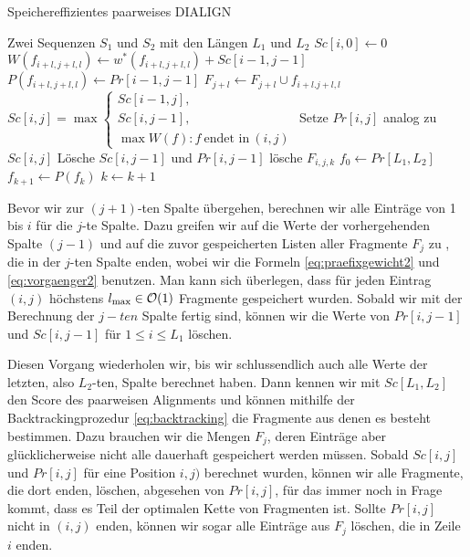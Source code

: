 \begin{algorithm}[H]
	\caption{Speichereffizientes paarweises DIALIGN}
	\label{alg:speichereffizient}
	\begin{algorithmic}[1]
		
		\Require Zwei Sequenzen $S_1$ und $S_2$ mit den Längen $L_1$ und $L_2$
		\State $Sc[i,0] \gets 0$
		\EndFor
		\label{algl:fragmentgewichte}
		\State $W(f_{i+l,j+l,l}) \gets w^*(f_{i+l,j+l,l}) + Sc[i\!-\!1,j\!-\!1]$
		\State $P(f_{i+l,j+l,l}) \gets Pr[i\!-\!1,j\!-\!1]$
		\State $F_{j+l} \gets F_{j+l} \cup {f_{i+l.j+l,l}}$\label{algl:fragmentliste}
		\EndFor
		\State
		$Sc[i,j] = \max
		\begin{cases}
		Sc[i\!-\!1,j], \\
		Sc[i,j\!-\!1], \\
		\max{W(f): f\: \text{endet in}\: (i,j)}
		\end{cases}$\label{algl:praefix}
		\State Setze $Pr[i,j]$ analog zu $Sc[i,j]$
		\State Lösche $Sc[i,j\!-\!1]$ und $Pr[i,j\!-\!1]$
		\State lösche $F_{i,j,k}$
		\EndFor
		\EndFor
		\EndFor
		\State $f_0 \gets Pr[L_1,L_2]$
		\State $f_{k+1} \gets P(f_{k})$
		\State $k \gets k+1$
		\EndWhile 
		\EndProcedure
	\end{algorithmic}
\end{algorithm}

Bevor wir zur $(j+1)$-ten Spalte übergehen, berechnen wir alle Einträge von 1 bis $i$ für die $j$-te Spalte. Dazu greifen wir auf die Werte der vorhergehenden Spalte $(j-1)$ und auf die zuvor gespeicherten Listen aller Fragmente $F_j$ zu , die in der $j$-ten Spalte enden, wobei wir die Formeln \ref{eq:praefixgewicht2} und \ref{eq:vorgaenger2} benutzen. Man kann sich überlegen, dass für jeden Eintrag $(i,j)$ höchstens $l_{\max} \in \mathcal{O}(1)$ Fragmente gespeichert wurden. Sobald wir mit der Berechnung der $j-ten$ Spalte fertig sind, können wir die Werte von $Pr[i,j-1]$ und $Sc[i,j-1]$ für $1 \leq i \leq L_1$ löschen.

Diesen Vorgang wiederholen wir, bis wir schlussendlich auch alle Werte der letzten, also $L_2$-ten, Spalte berechnet haben. Dann kennen wir mit $Sc[L_1,L_2]$ den Score des paarweisen Alignments und können mithilfe der Backtrackingprozedur \ref{eq:backtracking} die Fragmente aus denen es besteht bestimmen. Dazu brauchen wir die Mengen $F_j$, deren Einträge aber glücklicherweise nicht alle dauerhaft gespeichert werden müssen. Sobald $Sc[i,j]$ und $Pr[i,j]$ für eine Position $i,j)$ berechnet wurden, können wir alle Fragmente, die dort enden, löschen, abgesehen von $Pr[i,j]$, für das immer noch in Frage kommt, dass es Teil der optimalen Kette von Fragmenten ist. Sollte $Pr[i,j]$ nicht in $(i,j)$ enden, können wir sogar alle Einträge aus $F_j$ löschen, die in Zeile $i$ enden.

